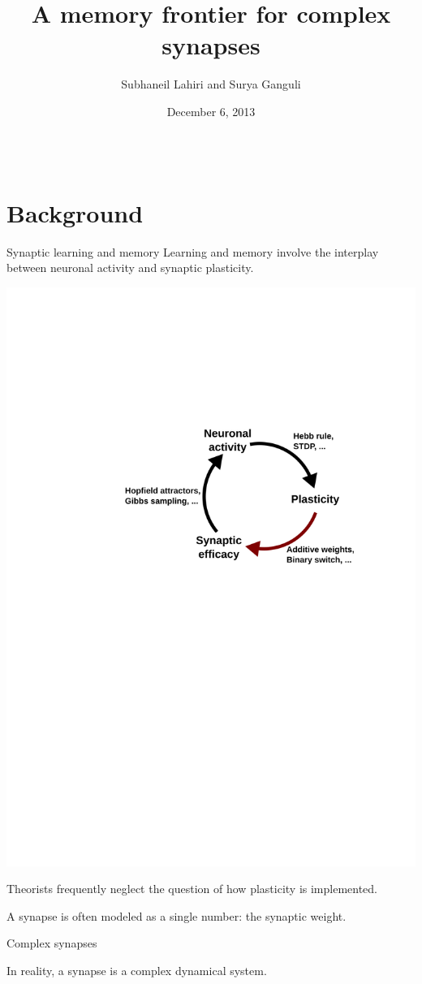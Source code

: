 \documentclass[final,hyperref={pdfpagelabels=false,bookmarks=false}]{beamer}
\title{A memory frontier for complex synapses}
\author{Subhaneil Lahiri and Surya Ganguli}
\institute[Stanford]{%
Department of Applied Physics, Stanford University, Stanford CA
}
\date{December 6, 2013}
\begin{document}
\begin{frame}{}

\begin{columns}[t]


\begin{column}{0.33\linewidth}

\section{Background}



\begin{block}{Synaptic learning and memory}
%
 Learning and memory involve the interplay between neuronal activity and synaptic plasticity.
 
 \begin{center}
   \includegraphics[width=0.4\linewidth]{synaptic_learning.svg}
 \end{center}
 
 Theorists frequently neglect the question of how plasticity is implemented.
 
 A synapse is often modeled as a single number: the synaptic weight.
%
\end{block}


\begin{block}{Complex synapses}
%
 \begin{minipage}[t]{0.53\linewidth}
   In reality, a synapse is a complex dynamical system.


\end{minipage}
\end{block}
\end{column}
\end{columns}
\end{frame}
\end{document}
